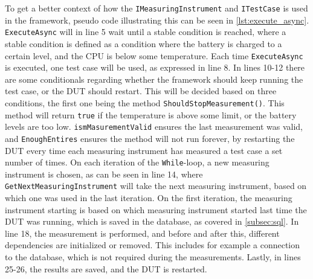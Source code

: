 To get a better context of how the \texttt{IMeasuringInstrument} and \texttt{ITestCase} is used in the framework, pseudo code illustrating this can be seen in \cref{lst:execute_async}. \texttt{ExecuteAsync} will in line 5 wait until a stable condition is reached, where a stable condition is defined as a condition where the battery is charged to a certain level, and the CPU is below some temperature. Each time \texttt{ExecuteAsync} is executed, one test case will be used, as expressed in line 8. In lines 10-12 there are some conditionals regarding whether the framework should keep running the test case, or the DUT should restart. This will be decided based on three conditions, the first one being the method \texttt{ShouldStopMeasurement()}. This method will return \texttt{true} if the temperature is above some limit, or the battery levels are too low. \texttt{ismMasurementValid} ensures the last measurement was valid, and \texttt{EnoughEntires} ensures the method will not run forever, by restarting the DUT every time each measuring instrument has measured a test case a set number of times. On each iteration of the \texttt{While}-loop, a new measuring instrument is chosen, as can be seen in line 14, where \texttt{GetNextMeasuringInstrument} will take the next measuring instrument, based on which one was used in the last iteration. On the first iteration, the measuring instrument starting is based on which measuring instrument started last time the DUT was running, which is saved in the database, as covered in \cref{subsec:sql}. In line 18, the measurement is performed, and before and after this, different dependencies are initialized or removed. This includes for example a connection to the database, which is not required during the measurements. Lastly, in lines 25-26, the results are saved, and the DUT is restarted.\newpage



